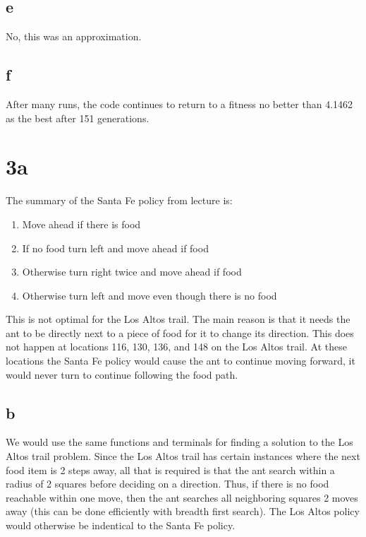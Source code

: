 \documentclass[12pt]{article}
\begin{document}
\subsection{e}
No, this was an approximation.

\subsection{f}
After many runs, the code continues to return to a fitness no better than 4.1462 as the best after 151 generations.

\section{3a}
The summary of the Santa Fe policy from lecture is:
\begin{enumerate}
  \item Move ahead if there is food
  \item If no food turn left and move ahead if food
  \item Otherwise turn right twice and move ahead if food
  \item Otherwise turn left and move even though there is no food
\end{enumerate}
This is not optimal for the Los Altos trail.  The main reason is that it needs the ant to be directly next to a piece of food for it to change its direction.  This does not happen at locations 116, 130, 136, and 148 on the Los Altos trail.  At these locations the Santa Fe policy would cause the ant to continue moving forward, it would never turn to continue following the food path.

\subsection{b}
We would use the same functions and terminals for finding a solution to the Los Altos trail problem. Since the Los Altos trail has certain instances where the next food item is 2 steps away, all that is required is that the ant search within a radius of 2 squares before deciding on a direction. Thus, if there is no food reachable within one move, then the ant searches all neighboring squares 2 moves away (this can be done efficiently with breadth first search). The Los Altos policy would otherwise be indentical to the Santa Fe policy.
\end{document}
